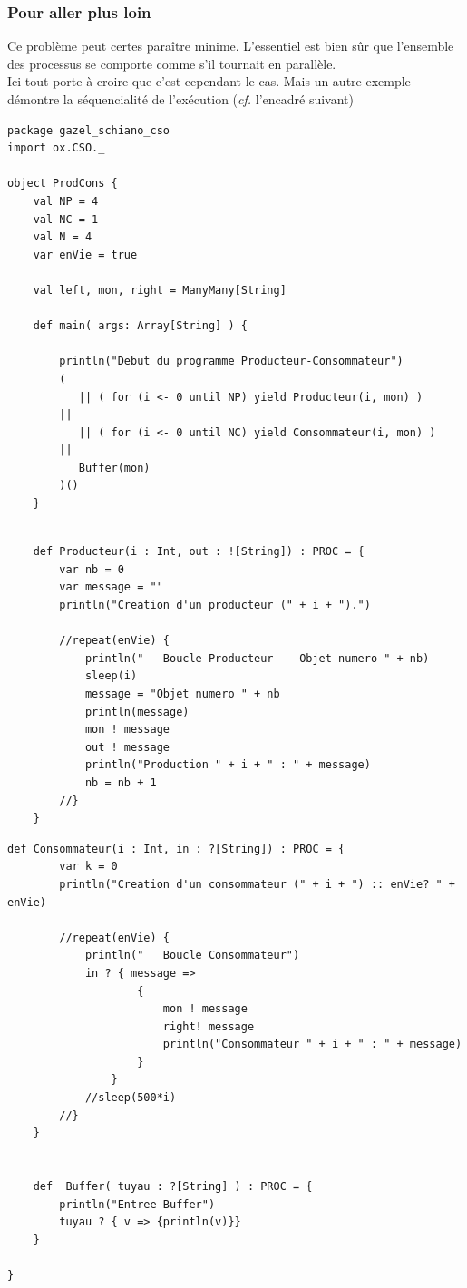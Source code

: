 \documentclass[a4paper,11pt,french]{report}
\begin{document}
\subsubsection{Pour aller plus loin}

Ce problème peut certes paraître minime. L'essentiel est bien sûr que l'ensemble des processus se comporte comme s'il tournait en parallèle.\\ Ici tout porte à croire que c'est cependant le cas. Mais un autre exemple démontre la séquencialité de l'exécution (\emph{cf.} l'encadré suivant)

\begin{lstlisting}[frame=trBL, title={Contre-exemple démontrant la séquentialité de l'exécution}]
package gazel_schiano_cso
import ox.CSO._

object ProdCons {
    val NP = 4
    val NC = 1
    val N = 4
    var enVie = true

    val left, mon, right = ManyMany[String]

    def main( args: Array[String] ) {
        
        println("Debut du programme Producteur-Consommateur")
        ( 
           || ( for (i <- 0 until NP) yield Producteur(i, mon) )
        || 
           || ( for (i <- 0 until NC) yield Consommateur(i, mon) )
        || 
           Buffer(mon) 
        )()
    }
\end{lstlisting}
\begin{lstlisting}[frame=trBL, title={Contre-exemple, suite : Producteur}, firstnumber=last]    
    
    def Producteur(i : Int, out : ![String]) : PROC = {
        var nb = 0
        var message = ""
        println("Creation d'un producteur (" + i + ").")
        
        //repeat(enVie) {
            println("   Boucle Producteur -- Objet numero " + nb)
            sleep(i)
            message = "Objet numero " + nb
            println(message)
            mon ! message
            out ! message
            println("Production " + i + " : " + message)
            nb = nb + 1
        //}
    }
\end{lstlisting}
\begin{lstlisting}[frame=trBL, title={Contre-exemple, suite : Consommateur et Buffer}, firstnumber=last]
    def Consommateur(i : Int, in : ?[String]) : PROC = {
        var k = 0
        println("Creation d'un consommateur (" + i + ") :: enVie? " + enVie)
        
        //repeat(enVie) {
            println("   Boucle Consommateur")
            in ? { message => 
                    {
                        mon ! message 
                        right! message 
                        println("Consommateur " + i + " : " + message)
                    } 
                }
            //sleep(500*i)
        //}
    }  
    

    def  Buffer( tuyau : ?[String] ) : PROC = {
        println("Entree Buffer")
        tuyau ? { v => {println(v)}}
    }
    
}
\end{lstlisting}
\end{document}
